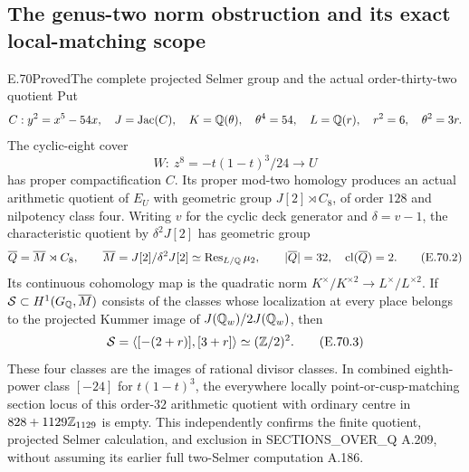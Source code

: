 \subsection{The genus-two norm obstruction and its exact local-matching scope}

\begin{result}{E.70}{Proved}{The complete projected Selmer group and the actual order-thirty-two quotient}
Put
\[
 C:y^2=x^5-54x,\quad J=\operatorname{Jac}(C),\quad
 K=\mathbb Q(\theta),\quad\theta^4=54,\quad
 L=\mathbb Q(r),\quad r^2=6,\quad\theta^2=3r.
\]
The cyclic-eight cover
\[
 W:\ z^8=-t(1-t)^3/24\longrightarrow U
 \tag{E.70.1}
\]
has proper compactification $C$. Its proper mod-two homology produces
an actual arithmetic quotient of $E_U$ with geometric group
$J[2]\rtimes C_8$, of order $128$ and nilpotency class four.
Writing $v$ for the cyclic deck generator and $\delta=v-1$, the
characteristic quotient by $\delta^2J[2]$ has geometric group
\[
 \overline Q=\overline M\rtimes C_8,\qquad
 \overline M=J[2]/\delta^2J[2]
       \simeq\operatorname{Res}_{L/\mathbb Q}\mu_2,
 \qquad |\overline Q|=32,\quad\operatorname{cl}(\overline Q)=2.
 \tag{E.70.2}
\]
Its continuous cohomology map is the quadratic norm
$K^\times/K^{\times2}\to L^\times/L^{\times2}$.
If $\mathcal S\subset H^1(G_\mathbb Q,\overline M)$ consists of the classes
whose localization at every place belongs to the projected Kummer
image of $J(\mathbb Q_w)/2J(\mathbb Q_w)$, then
\[
 \mathcal S=\langle[-(2+r)],[3+r]\rangle\simeq(\mathbb Z/2)^2.
 \tag{E.70.3}
\]
These four classes are the images of rational divisor classes.
In combined eighth-power class $[-24]$ for $t(1-t)^3$, the
everywhere locally point-or-cusp-matching section locus of this
order-$32$ arithmetic quotient with ordinary centre in
$828+1129\mathbb Z_{1129}$ is empty. This independently confirms the
finite quotient, projected Selmer calculation, and exclusion in
SECTIONS\_OVER\_Q A.209, without assuming its earlier full
two-Selmer computation A.186.
\end{result}
